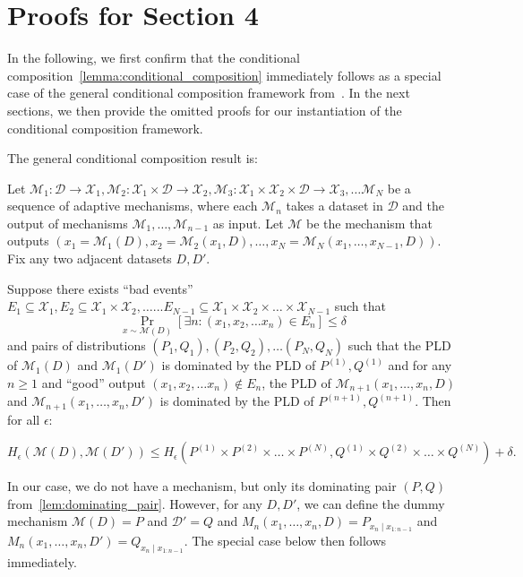 \section{Proofs for Section 4}\label{appendix:proofs_conditional_composition}

In the following, we first confirm that the conditional composition~\cref{lemma:conditional_composition} immediately follows as a special case of the general conditional composition framework from~\cite{choquette2023privacy}. In the next sections, we then provide the omitted proofs for our instantiation of the conditional composition framework.

The general conditional composition result is:
\begin{theorem}\label{thm:conditioningtrick}
Let $\mathcal{M}_1: \mathcal{D} \rightarrow \mathcal{X}_1, \mathcal{M}_2: \mathcal{X}_1 \times \mathcal{D} \rightarrow \mathcal{X}_2, \mathcal{M}_3: \mathcal{X}_1 \times \mathcal{X}_2 \times \mathcal{D} \rightarrow \mathcal{X}_3, \ldots \mathcal{M}_N$ be a sequence of adaptive mechanisms, where each $\mathcal{M}_n$ takes a dataset in $\mathcal{D}$ and the output of mechanisms $\mathcal{M}_1, \ldots, \mathcal{M}_{n-1}$ as input. Let $\mathcal{M}$ be the mechanism that outputs $(x_1 = \mathcal{M}_1(D), x_2 = \mathcal{M}_2(x_1, D), \ldots, x_N = \mathcal{M}_N(x_1, \ldots, x_{N-1}, D))$. Fix any two adjacent datasets $D, D'$. 

Suppose there exists ``bad events'' $E_1 \subseteq \mathcal{X}_1, E_2 \subseteq \mathcal{X}_1 \times \mathcal{X}_2, \ldots... E_{N-1} \subseteq \mathcal{X}_1 \times \mathcal{X}_2 \times \ldots \times \mathcal{X}_{N-1}$ such that \[\Pr_{x \sim \mathcal{M}(D)}\left[\exists n: (x_1, x_2, \ldots x_n) \in E_n\right] \leq \delta\] and pairs of distributions $(P_1, Q_1), (P_2, Q_2), \ldots (P_N, Q_N)$ such that the PLD of $\mathcal{M}_1(D)$ and $\mathcal{M}_1(D')$ is dominated by the PLD of $P^{(1)}, Q^{(1)}$ and for any $n \geq 1$ and ``good'' output $(x_1, x_2, \ldots x_n) \notin E_n$, the PLD of $\mathcal{M}_{n+1}(x_1, \ldots, x_n, D)$ and $\mathcal{M}_{n+1}(x_1, \ldots, x_n, D')$ is dominated by the PLD of $P^{(n+1)}, Q^{(n+1)}$. Then for all $\epsilon$:

\[H_\epsilon(\mathcal{M}(D), \mathcal{M}(D')) \leq H_\epsilon\left(P^{(1)} \times P^{(2)} \times \ldots \times P^{(N)}, Q^{(1)} \times Q^{(2)} \times \ldots \times Q^{(N)}\right) + \delta.\]
\end{theorem}
In our case, we do not have a mechanism, but only its dominating pair $(P, Q)$ from~\cref{lem:dominating_pair}.
However, for any $D, D'$, we can define the dummy mechanism $\mathcal{M}(D) = P$ and $\mathcal{D}' = Q$ and $M_{n}(x_1,\dots,x_n, D) = P_{x_n \mid x_{1:n-1}}$ and $M_{n}(x_1,\dots,x_n, D') = Q_{x_n \mid x_{1:n-1}}$. The special case below then follows immediately.
\conditionalcomposition*


